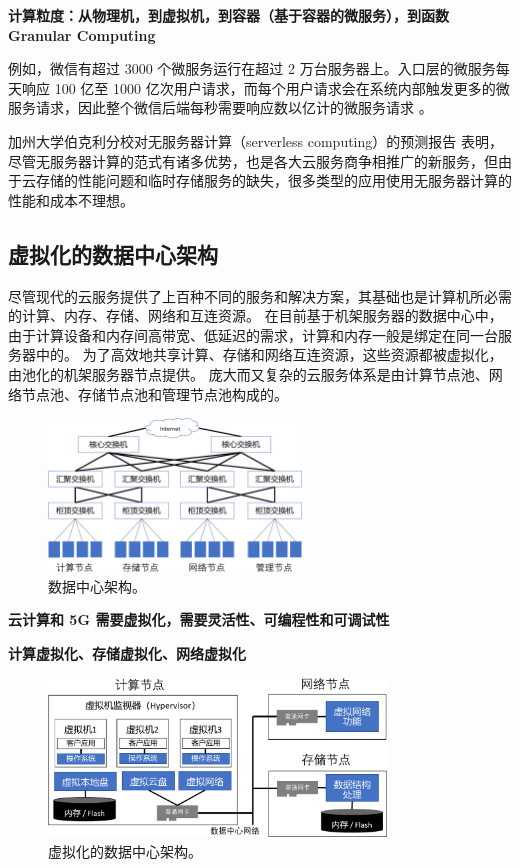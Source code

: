 \textbf{计算粒度：从物理机，到虚拟机，到容器（基于容器的微服务），到函数 Granular Computing}

例如，微信有超过 3000 个微服务运行在超过 2 万台服务器上。入口层的微服务每天响应 100 亿至 1000 亿次用户请求，而每个用户请求会在系统内部触发更多的微服务请求，因此整个微信后端每秒需要响应数以亿计的微服务请求 \cite{zhou2018overload}。

加州大学伯克利分校对无服务器计算（serverless computing）的预测报告 \cite{jonas2019cloud} 表明，尽管无服务器计算的范式有诸多优势，也是各大云服务商争相推广的新服务，但由于云存储的性能问题和临时存储服务的缺失，很多类型的应用使用无服务器计算的性能和成本不理想。


\subsection{虚拟化的数据中心架构}

尽管现代的云服务提供了上百种不同的服务和解决方案，其基础也是计算机所必需的计算、内存、存储、网络和互连资源。
在目前基于机架服务器的数据中心中，由于计算设备和内存间高带宽、低延迟的需求，计算和内存一般是绑定在同一台服务器中的。
为了高效地共享计算、存储和网络互连资源，这些资源都被虚拟化，由池化的机架服务器节点提供。
庞大而又复杂的云服务体系是由计算节点池、网络节点池、存储节点池和管理节点池构成的。

\begin{figure}[htbp]
	\centering
	\includegraphics[width=0.6\textwidth]{figures/DC_arch.pdf}
	\caption{数据中心架构。}
	\label{background:fig:cloud-architecture}
\end{figure}


\textbf{云计算和 5G 需要虚拟化，需要灵活性、可编程性和可调试性}

\textbf{计算虚拟化、存储虚拟化、网络虚拟化}


\begin{figure}[htbp]
	\centering
	\includegraphics[width=0.8\textwidth]{figures/virt_arch.pdf}
	\caption{虚拟化的数据中心架构。}
	\label{background:fig:virt-architecture}
\end{figure}


